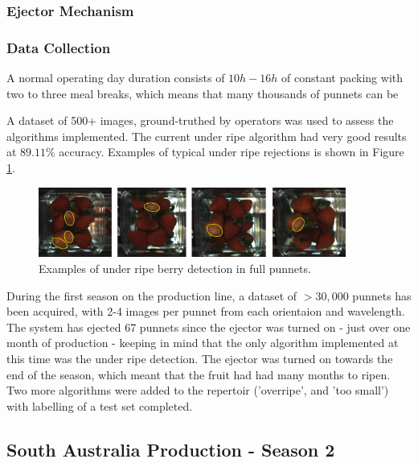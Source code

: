 \documentclass[fleqn,twoside]{article}
\begin{document}
\subsubsection{Ejector Mechanism}







\subsubsection{Data Collection}

A normal operating day duration consists of $10h-16h$ of constant packing with two to three meal breaks, which means that many thousands of punnets can be 

A dataset of 500+ images, ground-truthed by operators was used to assess the algorithms implemented. The current under ripe algorithm had very good results at $89.11\%$ accuracy. Examples of typical under ripe rejections is shown in Figure \ref{fig:UR_berries}.


\begin{figure}[h]
	\centering
	\includegraphics[width=0.9\textwidth]{UR_berries.png}
	\caption{Examples of under ripe berry detection in full punnets.}
	\label{fig:UR_berries}
\end{figure}




During the first season on the production line, a dataset of $>30,000$ punnets has been acquired, with 2-4 images per punnet from each orientaion and wavelength. The system has ejected 67 punnets since the ejector was turned on - just over one month of production - keeping in mind that the only algorithm implemented at this time was the under ripe detection. The ejector was turned on towards the end of the season, which meant that the fruit had had many months to ripen. Two more algorithms were added to the repertoir ('overripe', and 'too small') with labelling of a test set completed.


\subsection{South Australia Production - Season 2}
\end{document}
